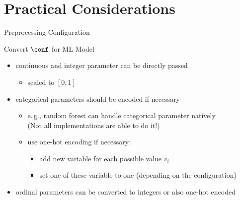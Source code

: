 \section{Practical Considerations}
\begin{frame}[c]{Preprocessing Configuration}

\begin{block}{Convert $\conf$ for ML Model}
\begin{itemize}
\item continuous and integer parameter can be directly passed
\begin{itemize}
\item scaled to $[0,1]$
\end{itemize}
\pause
\item categorical parameters should be encoded if necessary
\begin{itemize}
\item e.$\,$g., random forest can handle categorical parameter natively\\
(Not all implementations are able to do it!) 
\item use one-hot encoding if necessary:
\begin{itemize}
	\item add new variable for each possible value $v_i$
	\item set one of these variable to one (depending on the configuration)
\end{itemize}
\end{itemize}
\pause
\item ordinal parameters can be converted to integers or also one-hot encoded
\end{itemize}
\end{block}


\end{frame}
